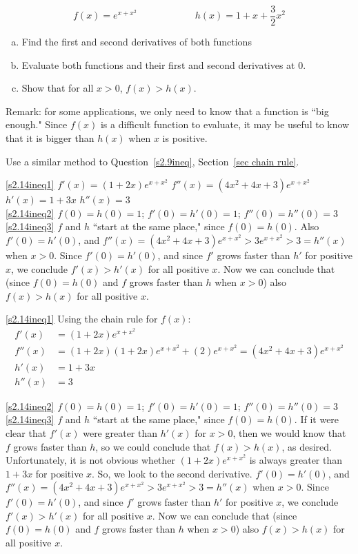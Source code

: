\begin{question}[1999H]
\[f(x)=e^{x+x^2}\qquad \qquad \qquad h(x)=1+x+\frac{3}{2}x^2\]
\begin{enumerate}[(a)]
\item\label{s2.14ineq1} Find the first and second derivatives of both functions
\item\label{s2.14ineq2} Evaluate both functions and their first and second derivatives at 0.
\item\label{s2.14ineq3} Show that for all $x>0$, $f(x)>h(x)$.
\end{enumerate}
Remark: for some applications, we only need to know that a function is ``big enough." Since $f(x)$ is a difficult function to evaluate, it may be useful to know that it is bigger than $h(x)$ when $x$ is positive.
\end{question}
\begin{hint} Use a similar method to Question~\ref{s2.9ineq}, Section~\ref*{sec chain rule}.
\end{hint}
\begin{answer}
\eqref{s2.14ineq1} $f'(x)=(1+2x)e^{x+x^2}$ \quad $f''(x)=(4x^2+4x+3)e^{x+x^2}$\quad
 $h'(x)=1+3x$ \quad $h''(x)=3$\\
\eqref{s2.14ineq2} $f(0)=h(0)=1$; \quad $f'(0)=h'(0)=1$; \quad $f''(0)=h''(0)=3$\\
\eqref{s2.14ineq3} $f$ and $h$ ``start at the same place," since $f(0)=h(0)$. Also $f'(0)=h'(0)$, and $f''(x)=(4x^2+4x+3)e^{x+x^2} > 3e^{x+x^2}>3=h''(x)$ when $x>0$. Since $f'(0)=h'(0)$, and since $f'$ grows faster than $h'$ for positive $x$, we conclude $f'(x)>h'(x)$ for all positive $x$. Now we can conclude that (since $f(0)=h(0)$ and $f$ grows faster than $h$ when $x>0$) also $f(x)>h(x)$ for all positive $x$.
\end{answer}
\begin{solution}
\eqref{s2.14ineq1}
Using the chain rule for $f(x)$:
\begin{align*}
f'(x)&=(1+2x)e^{x+x^2}\\
f''(x)&=(1+2x)(1+2x)e^{x+x^2}+(2)e^{x+x^2}=(4x^2+4x+3)e^{x+x^2}\\
h'(x)&=1+3x\\
h''(x)&=3
\end{align*}

\eqref{s2.14ineq2} $f(0)=h(0)=1$; \quad $f'(0)=h'(0)=1$; \quad $f''(0)=h''(0)=3$\\
\eqref{s2.14ineq3} $f$ and $h$ ``start at the same place," since $f(0)=h(0)$. If it were clear that $f'(x)$ were greater than $h'(x)$ for $x>0$, then we  would know that $f$ grows faster than $h$, so we could conclude that $f(x)>h(x)$, as desired. Unfortunately, it is not obvious whether $(1+2x)e^{x+x^2}$ is always greater than $1+3x$ for positive $x$. So, we look to the second derivative. $f'(0)=h'(0)$, and $f''(x)=(4x^2+4x+3)e^{x+x^2} > 3e^{x+x^2}>3=h''(x)$ when $x>0$. Since $f'(0)=h'(0)$, and since $f'$ grows faster than $h'$ for positive $x$, we conclude $f'(x)>h'(x)$ for all positive $x$. Now we can conclude that (since $f(0)=h(0)$ and $f$ grows faster than $h$ when $x>0$) also $f(x)>h(x)$ for all positive $x$.
\end{solution}


